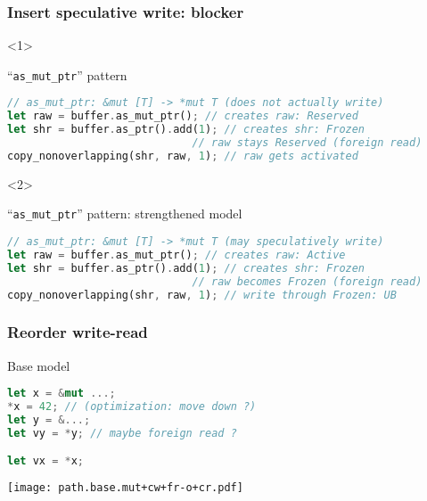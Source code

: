 \begin{frame}[fragile]
    \frametitle{Insert speculative write: blocker}
    \begin{onlyenv}<1>
        \begin{block}{{\cmark} ``\texttt{as\_mut\_ptr}'' pattern}
            \begin{lstlisting}[language=rust, basicstyle=\ttfamily\scriptsize]
// as_mut_ptr: &mut [T] -> *mut T (does not actually write)
let raw = buffer.as_mut_ptr(); // creates raw: Reserved
let shr = buffer.as_ptr().add(1); // creates shr: Frozen
                             // raw stays Reserved (foreign read)
copy_nonoverlapping(shr, raw, 1); // raw gets activated
            \end{lstlisting}
        \end{block}
    \end{onlyenv}

    \begin{onlyenv}<2>
        \begin{block}{{\xmark} ``\texttt{as\_mut\_ptr}'' pattern: strengthened model}
            \begin{lstlisting}[language=rust, basicstyle=\ttfamily\scriptsize]
// as_mut_ptr: &mut [T] -> *mut T (may speculatively write)
let raw = buffer.as_mut_ptr(); // creates raw: Active
let shr = buffer.as_ptr().add(1); // creates shr: Frozen
                             // raw becomes Frozen (foreign read)
copy_nonoverlapping(shr, raw, 1); // write through Frozen: UB
            \end{lstlisting}
        \end{block}
    \end{onlyenv}
\end{frame}

\begin{frame}[fragile, t]
    \frametitle{Reorder write-read}
    \begin{block}{{\xmark} Base model}
        \begin{lstlisting}[language=rust]
let x = &mut ...;
*x = 42; // (optimization: move down ?)
let y = &...;
let vy = *y; // maybe foreign read ?

let vx = *x;
        \end{lstlisting}
    \end{block}
    \texttt{[image: path.base.mut+cw+fr-o+cr.pdf]}
\end{frame}

